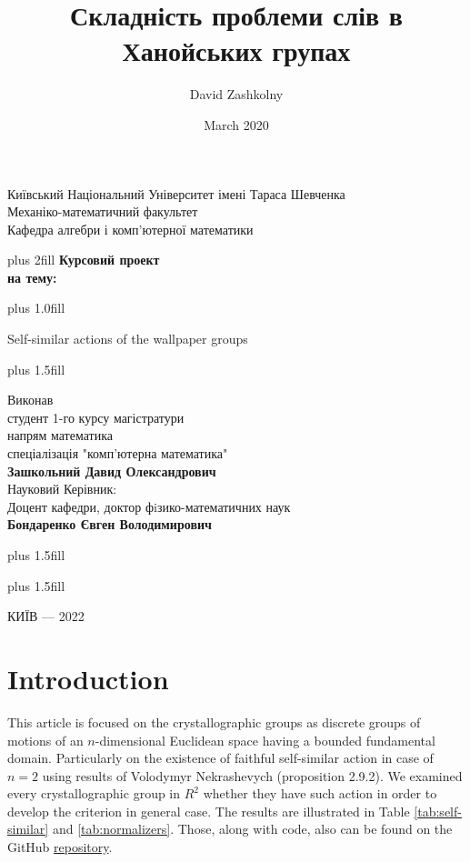 \documentclass[a4paper,12pt]{amsart}
\title{ 	Складність проблеми слів в Ханойських групах }
\author{ David Zashkolny }
\date{March 2020}
\begin{document}
	
	
	\thispagestyle {empty}
	\begin{center}
		\large  Київський Національний Університет імені Тараса Шевченка \\
		Механіко-математичний факультет \\
		Кафедра алгебри і комп'ютерної математики \par
	\end{center}
	
	
	\begin{center}
		\vskip0cm plus 2fill
		\vspace{2.5cm} {\bf Курсовий проект}\\
		
		{\bf на тему:}\\
	\end{center}
	
	
	\vskip0cm plus 1.0fill
	
	
	
	\begin{center}\bf
		{\LARGE
			Self-similar actions of the wallpaper groups 
		\par}
	\end{center}
	
	\vskip0cm plus 1.5fill
	
	\hangindent=7cm  \noindent
	Виконав\\
	студент 1-го курсу магістратури\\
	напрям математика\\
	спеціалізація "комп'ютерна математика"\\
	{\bf Зашкольний Давид Олександрович}\\[2cm]
	Науковий Керівник:\\
	Доцент кафедри, доктор фiзико-математичних наук\\
	{\bf Бондаренко Євген Володимирович}
	
	
	\vskip0cm plus 1.5fill
	
	\vskip5cm plus 1.5fill
	\begin{center}
		КИЇВ --- 2022
	\end{center}
	
	\newpage
	
	\tableofcontents
	
	\newpage
	
	\section{Introduction}
	This article is focused on the crystallographic groups as discrete groups of motions of an $n$-dimensional Euclidean space having a bounded fundamental domain. Particularly on the existence of faithful self-similar action in case of $n=2$ using results of Volodymyr Nekrashevych \cite{Nekrashevych} (proposition 2.9.2). We examined every crystallographic group in $R^2$ whether they have such action in order to develop the criterion in general case. The results are illustrated in Table \ref{tab:self-similar} and \ref{tab:normalizers}. Those, along with code, also can be found on the GitHub \href{https://github.com/davendiy/master_thesis}{repository}.
	
\end{document}
